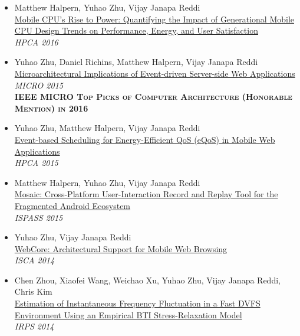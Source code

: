\documentclass[margin, 9pt]{res} %
\begin{document}
\begin{resume}
\begin{itemize}[leftmargin=*]
	\item Matthew Halpern, Yuhao Zhu, Vijay Janapa Reddi\\[2pt]
          {\href{http://yuhaozhu.com/pubs/hpca16.pdf}{Mobile CPU's Rise to Power: Quantifying the Impact of Generational Mobile CPU Design Trends on Performance, Energy, and User Satisfaction}}\\
          \textit{HPCA 2016}

	\item Yuhao Zhu, Daniel Richins, Matthew Halpern, Vijay Janapa Reddi\\[2pt]
          \href{http://yuhaozhu.com/pubs/micro15.pdf}{Microarchitectural Implications of Event-driven Server-side Web Applications}\\
          \textit{MICRO 2015}\\
          \textbf{\textsc{IEEE MICRO Top Picks of Computer Architecture (Honorable Mention) in 2016}}

	\item Yuhao Zhu, Matthew Halpern, Vijay Janapa Reddi\\[2pt]
          \href{http://yuhaozhu.com/pubs/hpca15.pdf}{Event-based Scheduling for Energy-Efficient QoS (eQoS) in Mobile Web Applications}\\
          \textit{HPCA 2015}

	\item Matthew Halpern, Yuhao Zhu, Vijay Janapa Reddi\\[2pt]
          \href{http://yuhaozhu.com/pubs/ispass15.pdf}{Mosaic: Cross-Platform User-Interaction Record and Replay Tool for the Fragmented Android Ecosystem}\\
          \textit{ISPASS 2015}

	\item Yuhao Zhu, Vijay Janapa Reddi\\[2pt]
          \href{http://yuhaozhu.com/pubs/isca14.pdf}{WebCore: Architectural Support for Mobile Web Browsing}\\
          \textit{ISCA 2014}

	\item Chen Zhou, Xiaofei Wang, Weichao Xu, Yuhao Zhu, Vijay Janapa Reddi, Chris Kim\\[2pt]
          \href{http://yuhaozhu.com/pubs/irps14.pdf}{Estimation of Instantaneous Frequency Fluctuation in a Fast DVFS Environment Using an Empirical BTI Stress-Relaxation Model}\\
          \textit{IRPS 2014}


\end{itemize}
\end{resume}
\end{document}
